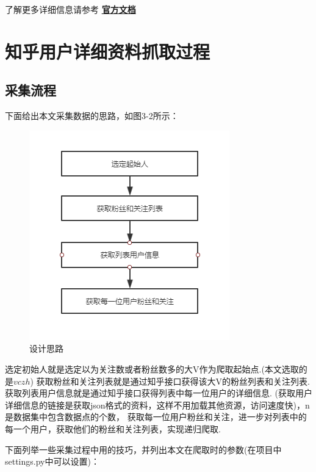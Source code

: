 \documentclass[bachelor,adobefonts]{jnuthesis}
\begin{document}
了解更多详细信息请参考
\textbf{\href{https://doc.scrapy.org/en/latest/}{官方文档}}




\section{知乎用户详细资料抓取过程}
\subsection{采集流程}
下面给出本文采集数据的思路，如图3-2所示：

\begin{figure}[h!]
  \centering
  \includegraphics[width=0.4\linewidth]{Wsilu.png}
  \caption{设计思路}
\end{figure}

选定初始人就是选定以为关注数或者粉丝数多的大V作为爬取起始点.(本文选取的是$vczh$)
获取粉丝和关注列表就是通过知乎接口获得该大V的粉丝列表和关注列表.
获取列表用户信息就是通过知乎接口获得列表中每一位用户的详细信息.
(获取用户详细信息的链接是获取json格式的资料，这样不用加载其他资源，访问速度快)，n是数据集中包含数据点的个数，
获取每一位用户粉丝和关注，进一步对列表中的每一个用户，获取他们的粉丝和关注列表，实现递归爬取.

下面列举一些采集过程中用的技巧，并列出本文在爬取时的参数(在项目中settings.py中可以设置)：
\end{document}
